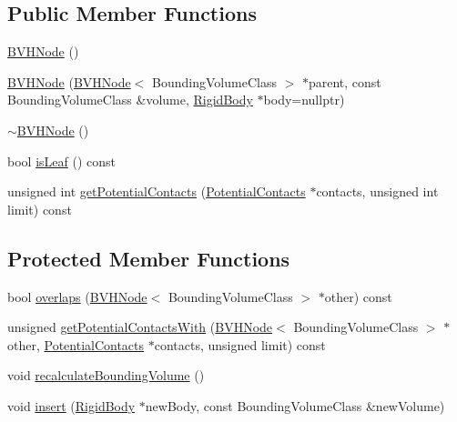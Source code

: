 \subsection*{Public Member Functions}
\begin{DoxyCompactItemize}
\item 
\mbox{\hyperlink{classr3_1_1_b_v_h_node_a31b8beb2d10f5df915be92eab4bdd7f6}{B\+V\+H\+Node}} ()
\item 
\mbox{\hyperlink{classr3_1_1_b_v_h_node_a983ae7d4ab515427436692b8a846da6f}{B\+V\+H\+Node}} (\mbox{\hyperlink{classr3_1_1_b_v_h_node}{B\+V\+H\+Node}}$<$ Bounding\+Volume\+Class $>$ $\ast$parent, const Bounding\+Volume\+Class \&volume, \mbox{\hyperlink{classr3_1_1_rigid_body}{Rigid\+Body}} $\ast$body=nullptr)
\item 
\mbox{\hyperlink{classr3_1_1_b_v_h_node_a72194bd522058bfd362b0ab77c0303af}{$\sim$\+B\+V\+H\+Node}} ()
\item 
bool \mbox{\hyperlink{classr3_1_1_b_v_h_node_a517b40f1a91cda371b3cb786f1c7e155}{is\+Leaf}} () const
\item 
unsigned int \mbox{\hyperlink{classr3_1_1_b_v_h_node_a8c8980c3ece5abe91d2c5a01b1756a03}{get\+Potential\+Contacts}} (\mbox{\hyperlink{structr3_1_1_potential_contacts}{Potential\+Contacts}} $\ast$contacts, unsigned int limit) const
\end{DoxyCompactItemize}
\subsection*{Protected Member Functions}
\begin{DoxyCompactItemize}
\item 
bool \mbox{\hyperlink{classr3_1_1_b_v_h_node_a69ec6f958bbe07629cd979599532dfd8}{overlaps}} (\mbox{\hyperlink{classr3_1_1_b_v_h_node}{B\+V\+H\+Node}}$<$ Bounding\+Volume\+Class $>$ $\ast$other) const
\item 
unsigned \mbox{\hyperlink{classr3_1_1_b_v_h_node_aca88cf5bd4b1c4981198cec816f122e8}{get\+Potential\+Contacts\+With}} (\mbox{\hyperlink{classr3_1_1_b_v_h_node}{B\+V\+H\+Node}}$<$ Bounding\+Volume\+Class $>$ $\ast$other, \mbox{\hyperlink{structr3_1_1_potential_contacts}{Potential\+Contacts}} $\ast$contacts, unsigned limit) const
\item 
void \mbox{\hyperlink{classr3_1_1_b_v_h_node_a52539a0d78d758021a2fe4bedd30e671}{recalculate\+Bounding\+Volume}} ()
\item 
void \mbox{\hyperlink{classr3_1_1_b_v_h_node_ab6f91727e36689a7edc9f8c168ab904b}{insert}} (\mbox{\hyperlink{classr3_1_1_rigid_body}{Rigid\+Body}} $\ast$new\+Body, const Bounding\+Volume\+Class \&new\+Volume)
\end{DoxyCompactItemize}
